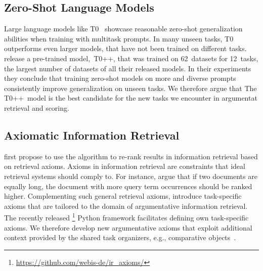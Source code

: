 \subsection{Zero-Shot Language Models}

Large language models like T0~\cite{SanhWRBSACSLRDBXTSSKCNDCJWMSYPBWNRSSFFTBGBWR2021} showcase reasonable zero-shot generalization abilities when training with multitask prompts.
In many unseen tasks, T0 outperforms even larger models, that have not been trained on different tasks.
\citet{SanhWRBSACSLRDBXTSSKCNDCJWMSYPBWNRSSFFTBGBWR2021} release a pre-trained model,~T0++, that was trained on 62~datasets for 12~tasks, the largest number of datasets of all their released models.
In their experiments they conclude that training zero-shot models on more and diverse prompts consistently improve generalization on unseen tasks.
We therefore argue that The T0++~model is the best candidate for the new tasks we encounter in argumentat retrieval and scoring.

\subsection{Axiomatic Information Retrieval}

\citet{HagenVGS2016} first propose to use the \KwikSort algorithm to re-rank results in information retrieval based on retrieval axioms.
Axioms in information retrieval are constraints that ideal retrieval systems should comply to.
For instance, \citet{FangTZ2004} argue that if two documents are equally long, the document with more query term occurrences should be ranked higher.
Complementing such general retrieval axioms, \citet{BondarenkoHVSPB2018} introduce task-specific axioms that are tailored to the domain of argumentative information retrieval.
The recently released \iraxioms\footnote{\url{https://github.com/webis-de/ir_axioms/}} Python framework facilitates defining own task-specific axioms.
We therefore develop new argumentative axioms that exploit additional context provided by the shared task organizers, e.g., comparative objects~\cite{BondarenkoFKSGBPBSWPH2022}.
